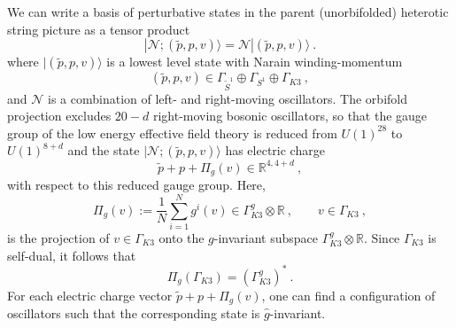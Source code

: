 \documentclass[a4paper,11pt]{article}
\newcommand{\RR}{\mathbb{R}}
\newcommand{\ZZ}{\mathbb{Z}}
\newcommand{\N}{\mathcal{N}}
\numberwithin{equation}{section}
\def\be{\begin{equation}}
\def\ee{\end{equation}}
\begin{document}
We can write a basis of perturbative states in the parent (unorbifolded) heterotic string picture as a tensor product
\be |\N;(\tilde p,p,v)\rangle=\N |(\tilde p,p,v)\rangle \ .
\ee  where $|(\tilde p,p,v)\rangle$ is a lowest level state with Narain winding-momentum  
\be (\tilde p,p,v)\in \Gamma_{\tilde S^1}\oplus\Gamma_{S^1}\oplus\Gamma_{K3}\ ,
\ee and $\N$ is a combination of left- and right-moving oscillators. 
%
%
%
%
The orbifold projection excludes $20-d$ right-moving bosonic oscillators, so that the gauge group of the low energy effective field  theory is reduced from $U(1)^{28}$ to $U(1)^{8+d}$ and the state $|\N;(\tilde p,p,v)\rangle$ has electric charge
\be \tilde p+p+\Pi_g(v)\in \RR^{4,4+d}\ ,
\ee with respect to this reduced gauge group. Here,
\be \Pi_g(v):=\frac{1}{N}\sum_{i=1}^N g^i(v)\in \Gamma_{K3}^g\otimes \RR\ ,\qquad v\in \Gamma_{K3}\ ,\ee
is the projection of $v\in \Gamma_{K3}$ onto the $g$-invariant subspace $\Gamma_{K3}^g\otimes \RR$. Since $\Gamma_{K3}$ is self-dual, it follows that \be \Pi_g(\Gamma_{K3})=(\Gamma_{K3}^g)^*\ .\ee For each electric charge vector $\tilde p+p+\Pi_g(v)$, one can find a configuration of oscillators such that the corresponding state is $\hat g$-invariant. 
\end{document}
